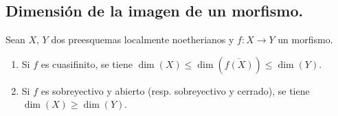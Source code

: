 \subsection{Dimensión de la imagen de un morfismo.}
\label{IV.2.s5.4-fr}

\begin{proposition}[5.4.1]
\label{IV.2.s5.4.1-fr}
Sean $X$, $Y$ dos preesquemas localmente noetherianos y $f:X\to Y$ un
morfismo.
\begin{enumerate}
\item[\textup{(i)}] Si $f$ es cuasifinito, se tiene
$\dim(X)\leq\dim(\overline{f(X)})\leq\dim(Y)$.
\item[\textup{(ii)}] Si $f$ es sobreyectivo y abierto \textup{(resp.} sobreyectivo y cerrado\textup{)}, se
tiene $\dim(X)\geq\dim(Y)$.
\end{enumerate}
\end{proposition}

